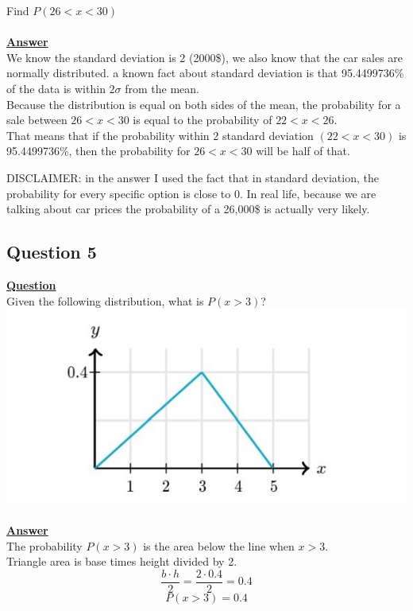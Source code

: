 \documentclass[a4, 12pt,titlepage]{scrartcl}
\begin{document}
 Find $P(26<x<30)$\\
 \smallskip\\
 \textbf{\underline{Answer}}\\
We know the standard deviation is 2 (2000\$), we also know that the car sales are normally distributed. a known fact about standard deviation is that 95.4499736\% of the data is within $2\sigma$ from the mean.\\
Because the distribution is equal on both sides of the mean, the probability for a sale between $26<x<30$ is equal to the probability of $22<x<26$.\\
That means that if the probability within 2 standard deviation $(22<x<30)$ is 95.4499736\%, then the probability for $26<x<30$ will be half of that.\\
\begin{center}
\end{center}
DISCLAIMER: in the answer I used the fact that in standard deviation, the probability for every specific option is close to 0.
In real life, because we are talking about car prices the probability of a 26,000\$ is actually very likely.
\newpage

\subsection{Question 5}
\textbf{\underline{Question}}\\
Given the following distribution, what is $P(x>3)$?\\
\includegraphics{DSgraph1.jpg}\\
\smallskip\\
\textbf{\underline{Answer}}\\
The probability $P(x>3)$ is the area below the line when $x>3$.\\
Triangle area is base times height divided by 2.\[
\frac{b\cdot h}{2}=\frac{2\cdot 0.4}{2}=0.4
\]
\[
\boxed{P(x>3)=0.4}
\]
 \newpage
\end{document}
